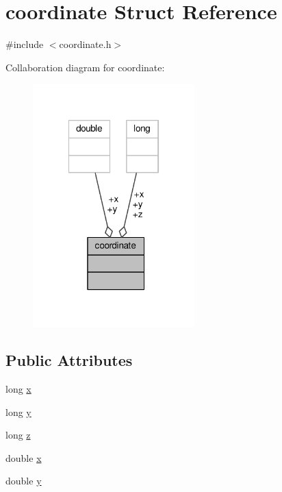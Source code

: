 \hypertarget{structcoordinate}{\section{coordinate Struct Reference}
\label{structcoordinate}
}


{\ttfamily \#include $<$coordinate.\-h$>$}



Collaboration diagram for coordinate\-:
\nopagebreak
\begin{figure}[H]
\begin{center}
\leavevmode
\includegraphics[width=177pt]{structcoordinate__coll__graph}
\end{center}
\end{figure}
\subsection*{Public Attributes}
\begin{DoxyCompactItemize}
\item 
long \hyperlink{structcoordinate_ab756588a9dc01e70d7f902a3430a0bb0}{x}
\item 
long \hyperlink{structcoordinate_a5dd6bd0e1a7f277f92a6b7681aa5ca8c}{y}
\item 
long \hyperlink{structcoordinate_afe22e7b768c82077d06355c86c133c21}{z}
\item 
double \hyperlink{structcoordinate_a3a164e660f2488a90d90f349d3b02010}{x}
\item 
double \hyperlink{structcoordinate_a11b4100f0f7449334bd3957db9be03cc}{y}
\end{DoxyCompactItemize}


